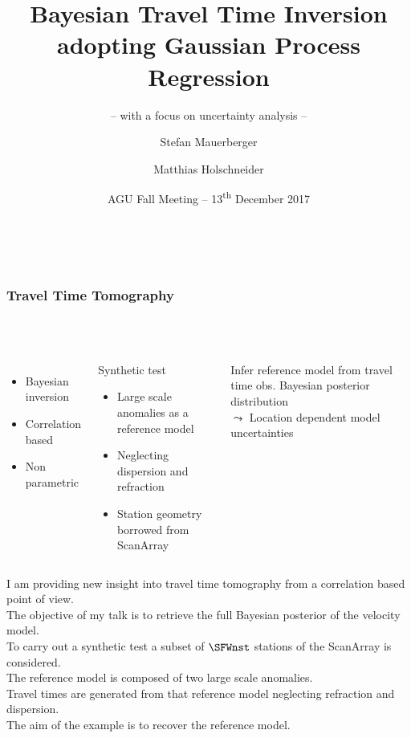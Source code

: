 \documentclass[aspectratio=169, t, 10pt, ]{beamer}
\title[Correlation based travel time inversion]{Bayesian Travel Time Inversion adopting Gaussian Process Regression}
\subtitle{-- with a focus on uncertainty analysis --}
\author[\tt mauerber@uni-potsdam.de]{Stefan Mauerberger \and Matthias Holschneider}
\institute[Math@UP]{University Potsdam, Institute of Mathematics}
\date[AGU~2017]{AGU Fall Meeting -- 13\textsuperscript{th} December 2017}
\begin{document}

~

\begin{frame}
    \frametitle{Travel Time Tomography}
    \framesubtitle{~}%
%
\begin{columns}%
%
%
    \begin{itemize}
        \item Bayesian inversion
        \item Correlation based
        \item Non parametric
    \end{itemize}

    \begin{exampleblock}{Synthetic test}
        \begin{itemize}
            \item Large scale anomalies as a reference model
            \item Neglecting dispersion and refraction
            \item Station geometry borrowed from ScanArray
        \end{itemize}
    \end{exampleblock}

    \begin{alertblock}{Infer reference model from travel time obs.}
        Bayesian posterior distribution \\
        \hfill {\Large $\leadsto$} Location dependent model uncertainties ~
    \end{alertblock}

    \vspace{-10mm}
    
\end{columns}

\end{frame}

I am providing new insight into travel time tomography from a correlation based point of view.
\\
The objective of my talk is to retrieve the full Bayesian posterior of the velocity model.
\\[2mm]

To carry out a synthetic test a subset of $\SFWnst$ stations of the ScanArray is considered.
\\
The reference model is composed of two large scale anomalies.
\\
Travel times are generated from that reference model neglecting refraction and dispersion.
\\
The aim of the example is to recover the reference model.
\end{document}
